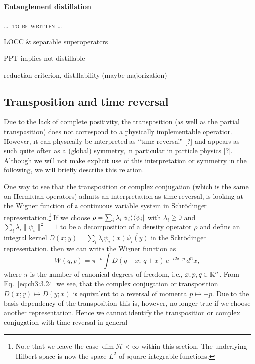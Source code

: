 \documentclass[11pt,a4paper]{article}
\numberwithin{equation}{section}
\begin{document}
\paragraph{Entanglement distillation} \dots\ \textsc{to be written} \dots

\noindent
LOCC \& separable superoperators

\noindent
PPT implies not distillable

\noindent
reduction criterion, distillability (maybe majorization)

\subsection{Transposition and time reversal}

Due to the lack of complete positivity, the transposition (as well as the partial transposition) does not correspond
to a physically implementable operation. However, it can physically be interpreted as ``time reversal'' [?] and
appears as such quite often as a (global) symmetry, in particular in particle physics [?]. Although we will not make
explicit use of this interpretation or symmetry in the following, we will briefly describe this relation.

One way to see that the transposition or complex conjugation (which is the same on Hermitian operators) admits an
interpretation as time reversal, is looking at the Wigner function of a continuous variable system in Schr\"odinger
representation.\footnote{Note that we leave the case $\dim \mathcal H < \infty$ within this section. The underlying
    Hilbert space is now the space $L^2$ of square integrable functions.} If we choose
$\rho=\sum_i \lambda_i |\psi_i\rangle\langle\psi_i|$ with $\lambda_i\ge 0$ and $\sum_i \lambda_i\|\psi_i\|^2=1$
to be a decomposition of a density operator $\rho$ and define an integral kernel
$D(x;y)=\sum_i \lambda_i \psi_i(x)\overline{\psi_i(y)}$ in the Schr\"odinger representation, then we can write
the Wigner function as
\begin{equation}\label{eq:ch3:3.24}
    W(q,p)=\pi^{-n}\int D(q-x;\,q+x)\,e^{-i2x\cdot p}\,d^n x,
\end{equation}
where $n$ is the number of canonical degrees of freedom, i.e., $x,p,q\in \mathbb{R}^n$. From Eq.~\eqref{eq:ch3:3.24} we see,
that the complex conjugation or transposition $D(x;y)\mapsto D(y;x)$ is equivalent to a reversal of momenta
$p\mapsto -p$. Due to the basis dependency of the transposition this is, however, no longer true if we choose another
representation. Hence we cannot identify the transposition or complex conjugation with time reversal in general.
\end{document}
